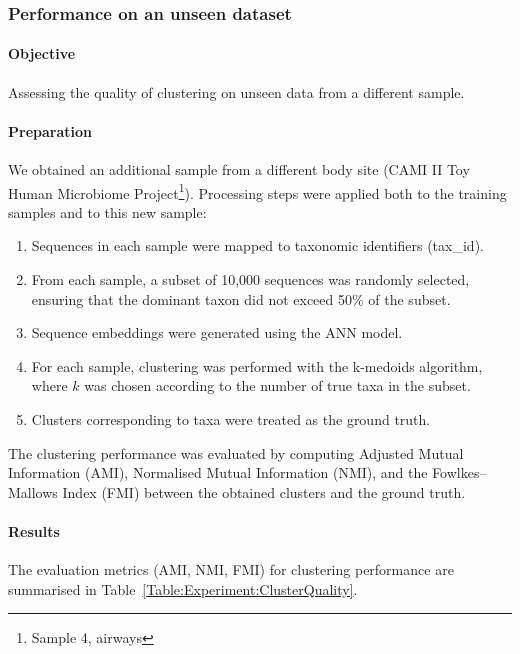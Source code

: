 \documentclass[biomedinformatics,article,submit,moreauthors]{Definitions/mdpi}
\begin{document}
            \subsubsection{Performance on an unseen dataset}

                \paragraph{Objective}
                Assessing the quality of clustering on unseen data from a different sample.

                \paragraph{Preparation}
                We obtained an additional sample from a different body site (CAMI II Toy Human Microbiome Project\footnote{Sample 4, airways}). Processing steps were applied both to the training samples and to this new sample:

                \begin{enumerate}
                    \item Sequences in each sample were mapped to taxonomic identifiers (tax\_id).
                    \item From each sample, a subset of 10,000 sequences was randomly selected, ensuring that the dominant taxon did not exceed 50\% of the subset.
                    \item Sequence embeddings were generated using the ANN model.
                    \item For each sample, clustering was performed with the k-medoids algorithm, where $k$ was chosen according to the number of true taxa in the subset.
                    \item Clusters corresponding to taxa were treated as the ground truth.
                \end{enumerate}

                The clustering performance was evaluated by computing Adjusted Mutual Information (AMI), Normalised Mutual Information (NMI), and the Fowlkes--Mallows Index (FMI) between the obtained clusters and the ground truth.

                \paragraph{Results}
                The evaluation metrics (AMI, NMI, FMI) for clustering performance are summarised in Table~\ref{Table:Experiment:ClusterQuality}.
\end{document}
